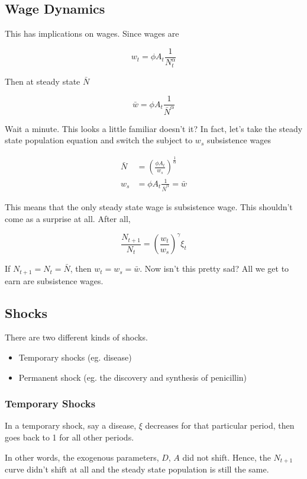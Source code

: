 \documentclass[11pt]{scrartcl}
\begin{document}
\subsection{Wage Dynamics}

This has implications on wages. Since wages are 

\[w_t = \phi A_t \frac{1}{N_t^\alpha} \]

Then at steady state $\bar{N}$

\[\bar{w} = \phi A_t \frac{1}{\bar{N}^\alpha} \]

Wait a minute. This looks a little familiar doesn't it? In fact, let's take the steady state population equation and switch the subject to $w_s$ subsistence wages

\begin{align*}
\bar{N} &= \left(\frac{\phi A_t}{w_s}\right)^\frac{1}{\alpha} \\
w_s &= \phi A_t \frac{1}{\bar{N}^\alpha} = \bar{w}
\end{align*}

This means that the only steady state wage is subsistence wage. This shouldn't come as a surprise at all. After all,

\[ \frac{N_{t+1}}{N_t} = \left(\frac{w_t}{w_s}\right)^\gamma \xi_t \]

If $N_{t+1} = N_t = \bar{N}$, then $w_t = w_s = \bar{w}$. Now isn't this pretty sad? All we get to earn are subsistence wages.

\subsection{Shocks}

There are two different kinds of shocks. 

\begin{itemize}
\item Temporary shocks (eg. disease)
\item Permanent shock (eg. the discovery and synthesis of penicillin)
\end{itemize}

\subsubsection{Temporary Shocks}

In a temporary shock, say a disease, $\xi$ decreases for that particular period, then goes back to 1 for all other periods. 

In other words, the exogenous parameters, $D$, $A$ did not shift. Hence, the $N_{t+1}$ curve didn't shift at all and the steady state population is still the same.
\end{document}
